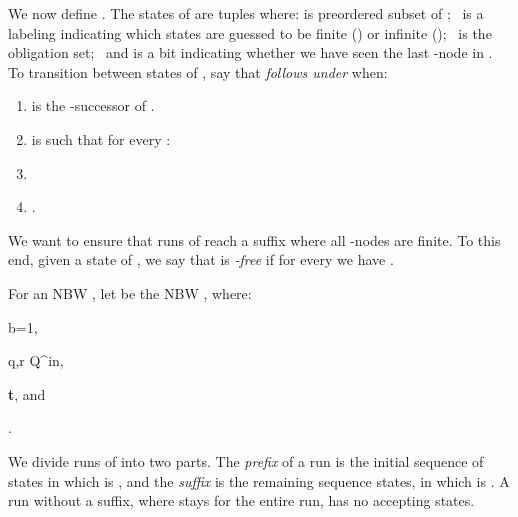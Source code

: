 \documentclass{LMCS}
\begin{document}
We now define . 
The states of  are tuples
 where:  is preordered subset of ;~
 is a labeling 
indicating which states are guessed to be finite () or
infinite ();~  is the
obligation set;~ and  is a bit indicating whether we have seen the last -node in
. 
To transition between states of , say that 
\emph{ follows
 under } when: 
\begin{enumerate}[(1)]
\item  is the -successor of . 
\item  is such that for every : 
\item 
\item .
\end{enumerate}
We want to ensure that runs of  reach a suffix where all -nodes are finite. To this
end, given a state of  , we say that  is \emph{-free} if
for every  we have .

\begin{defi}\label{Slice_Def}
For an NBW , let  be the NBW 
, where:
\begin{iteMize}{}
\item b=1\lambdaF,
\item q,r \in Q^{in},
\item \textbf{t}\sigma, and
\item .
\end{iteMize}
\end{defi}

\cbstart
We divide runs of  into two parts. The {\em prefix} of a run is the initial sequence of
states in which  is , and the {\em suffix} is the remaining sequence states, in
which  is . A run without a suffix, where  stays  for the entire run, has no accepting
states.
\cbend
\end{document}
